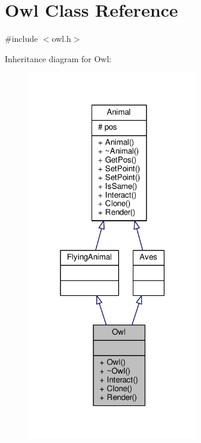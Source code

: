 \hypertarget{classOwl}{}\section{Owl Class Reference}
\label{classOwl}


{\ttfamily \#include $<$owl.\+h$>$}



Inheritance diagram for Owl\+:
\nopagebreak
\begin{figure}[H]
\begin{center}
\leavevmode
\includegraphics[width=210pt]{classOwl__inherit__graph}
\end{center}
\end{figure}


